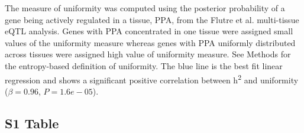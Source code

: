 \documentclass[10pt,letterpaper]{article}
\begin{document}
The measure of uniformity was computed using the posterior probability of a gene being actively regulated in a tissue, PPA, from the Flutre et al. \cite{Flutre_2013} multi-tissue eQTL analysis. Genes with PPA concentrated in one tissue were assigned small values of the uniformity measure whereas genes with PPA uniformly distributed across tissues were assigned high value of uniformity measure. See Methods for the entropy-based definition of uniformity. The blue line is the best fit linear regression and shows a significant positive correlation between h\textsuperscript{2} and uniformity ($\beta = 0.96$, $P = 1.6e-05$).
\pagebreak


\subsection*{S1 Table}
\label{S1_Table}
\end{document}

